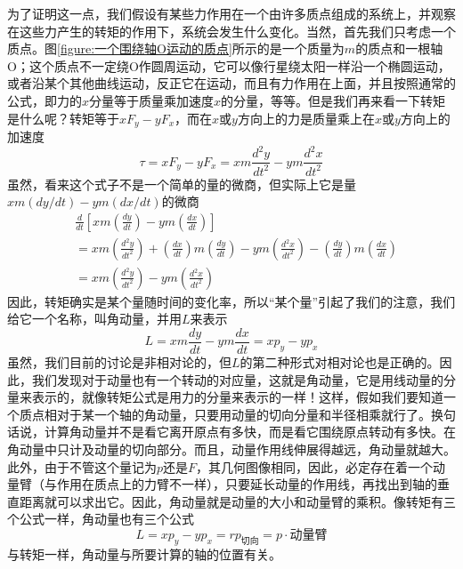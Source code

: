 为了证明这一点，我们假设有某些力作用在一个由许多质点组成的系统上，并观察在这些力产生的转矩的作用下，系统会发生什么变化。当然，首先我们只考虑一个质点。图\ref{figure:一个围绕轴O运动的质点}所示的是一个质量为$m$的质点和一根轴O；这个质点不一定绕O作圆周运动，它可以像行星绕太阳一样沿一个椭圆运动，或者沿某个其他曲线运动，反正它在运动，而且有力作用在上面，并且按照通常的公式，即力的$x$分量等于质量乘加速度$x$的分量，等等。但是我们再来看一下转矩是什么呢？转矩等于$xF_y-yF_x$，而在$x$或$y$方向上的力是质量乘上在$x$或$y$方向上的加速度
\begin{equation}
    \label{Eq:I:18:14}
    \tau = xF_y-yF_x = xm\frac{d^2y}{dt^2} - ym\frac{d^2x}{dt^2}
\end{equation}
虽然，看来这个式子不是一个简单的量的微商，但实际上它是量$xm(dy/dt)-ym(dx/dt)$的微商
\begin{equation}
    \label{Eq:I:18:15}
    \begin{aligned}
        & \frac{d}{dt}\left [xm\left (\frac{dy}{dt}\right ) - ym\left (\frac{dx}{dt}\right )\right ] \\
        &= xm\left (\frac{d^2y}{dt^2}\right ) + \left (\frac{dx}{dt}\right )m\left (\frac{dy}{dt}\right ) - ym\left (\frac{d^2x}{dt^2}\right ) - \left (\frac{dy}{dt}\right )m\left (\frac{dx}{dt}\right ) \\
        &= xm\left (\frac{d^2y}{dt^2}\right ) - ym\left (\frac{d^2x}{dt^2}\right )
    \end{aligned}
\end{equation}
因此，转矩确实是某个量随时间的变化率，所以“某个量”引起了我们的注意，我们给它一个名称，叫角动量，并用$L$来表示
\begin{equation}
    \label{Eq:I:18:16}
    L = xm\frac{dy}{dt} - ym\frac{dx}{dt} = xp_y - yp_x
\end{equation}
虽然，我们目前的讨论是非相对论的，但$L$的第二种形式对相对论也是正确的。因此，我们发现对于动量也有一个转动的对应量，这就是角动量，它是用线动量的分量来表示的，就像转矩公式是用力的分量来表示的一样！这样，假如我们要知道一个质点相对于某一个轴的角动量，只要用动量的切向分量和半径相乘就行了。换句话说，计算角动量并不是看它离开原点有多快，而是看它围绕原点转动有多快。在角动量中只计及动量的切向部分。而且，动量作用线伸展得越远，角动量就越大。此外，由于不管这个量记为$p$还是$F$，其几何图像相同，因此，必定存在着一个动量臂（与作用在质点上的力臂不一样），只要延长动量的作用线，再找出到轴的垂直距离就可以求出它。因此，角动量就是动量的大小和动量臂的乘积。像转矩有三个公式一样，角动量也有三个公式
\begin{equation}
    \label{Eq:I:18:17}
    L= xp_y - yp_x = rp_\text{切向} = p \cdot \text{动量臂}
\end{equation}
与转矩一样，角动量与所要计算的轴的位置有关。

